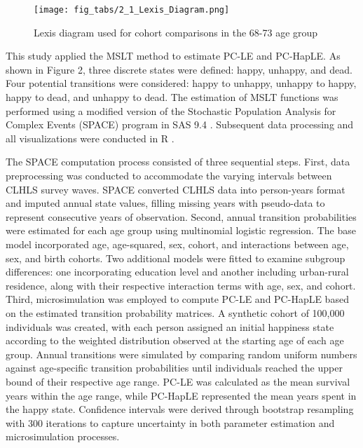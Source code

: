 \documentclass[12pt, a4paper]{article}
\begin{document}
\begin{figure}[htbp]
  \centering
  \texttt{[image: fig\_tabs/2\_1\_Lexis\_Diagram.png]}
  \caption{Lexis diagram used for cohort comparisons in the 68-73 age group}
  \label{fig:Lexis_Diagram}
\end{figure}

This study applied the MSLT method to estimate PC-LE and PC-HapLE. As shown in Figure 2, three discrete states were defined: happy, unhappy, and dead. Four potential transitions were considered: happy to unhappy, unhappy to happy, happy to dead, and unhappy to dead. The estimation of MSLT functions was performed using a modified version of the Stochastic Population Analysis for Complex Events (SPACE) program \autocite{cai.2010.estimation} in SAS 9.4 \autocite{sasinstituteinc..2016.sas}. Subsequent data processing and all visualizations were conducted in R \autocite{rcoreteam.2023.language}.

The SPACE computation process consisted of three sequential steps. First, data preprocessing was conducted to accommodate the varying intervals between CLHLS survey waves. SPACE converted CLHLS data into person-years format and imputed annual state values, filling missing years with pseudo-data to represent consecutive years of observation. Second, annual transition probabilities were estimated for each age group using multinomial logistic regression. The base model incorporated age, age-squared, sex, cohort, and interactions between age, sex, and birth cohorts. Two additional models were fitted to examine subgroup differences: one incorporating education level and another including urban-rural residence, along with their respective interaction terms with age, sex, and cohort. Third, microsimulation was employed to compute PC-LE and PC-HapLE based on the estimated transition probability matrices. A synthetic cohort of 100,000 individuals was created, with each person assigned an initial happiness state according to the weighted distribution observed at the starting age of each age group. Annual transitions were simulated by comparing random uniform numbers against age-specific transition probabilities until individuals reached the upper bound of their respective age range. PC-LE was calculated as the mean survival years within the age range, while PC-HapLE represented the mean years spent in the happy state. Confidence intervals were derived through bootstrap resampling with 300 iterations to capture uncertainty in both parameter estimation and microsimulation processes.
\end{document}
